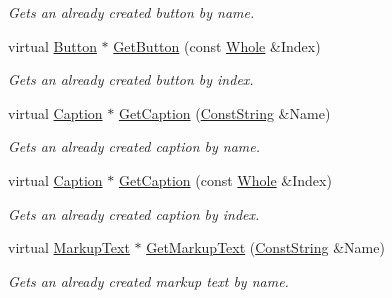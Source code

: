 \begin{DoxyCompactItemize}
\begin{DoxyCompactList}\small\item\em Gets an already created button by name. \item\end{DoxyCompactList}\item 
virtual \hyperlink{classMezzanine_1_1UI_1_1Button}{Button} $\ast$ \hyperlink{classMezzanine_1_1UI_1_1RenderableContainerWidget_ae18a59c3a4eee8dcba28229e6ada33bc}{GetButton} (const \hyperlink{namespaceMezzanine_adcbb6ce6d1eb4379d109e51171e2e493}{Whole} \&Index)
\begin{DoxyCompactList}\small\item\em Gets an already created button by index. \item\end{DoxyCompactList}\item 
virtual \hyperlink{classMezzanine_1_1UI_1_1Caption}{Caption} $\ast$ \hyperlink{classMezzanine_1_1UI_1_1RenderableContainerWidget_aa6c02feb49937d38bd265a2a808e6a57}{GetCaption} (\hyperlink{namespaceMezzanine_a63cd699ac54b73953f35ec9cfc05e506}{ConstString} \&Name)
\begin{DoxyCompactList}\small\item\em Gets an already created caption by name. \item\end{DoxyCompactList}\item 
virtual \hyperlink{classMezzanine_1_1UI_1_1Caption}{Caption} $\ast$ \hyperlink{classMezzanine_1_1UI_1_1RenderableContainerWidget_acdf3614fc900c3b33055f95cd9ba654c}{GetCaption} (const \hyperlink{namespaceMezzanine_adcbb6ce6d1eb4379d109e51171e2e493}{Whole} \&Index)
\begin{DoxyCompactList}\small\item\em Gets an already created caption by index. \item\end{DoxyCompactList}\item 
virtual \hyperlink{classMezzanine_1_1UI_1_1MarkupText}{MarkupText} $\ast$ \hyperlink{classMezzanine_1_1UI_1_1RenderableContainerWidget_ab37d9833f73a80cafc72d9b1b0a57c36}{GetMarkupText} (\hyperlink{namespaceMezzanine_a63cd699ac54b73953f35ec9cfc05e506}{ConstString} \&Name)
\begin{DoxyCompactList}\small\item\em Gets an already created markup text by name. \item\end{DoxyCompactList}\item 

\end{DoxyCompactItemize}
